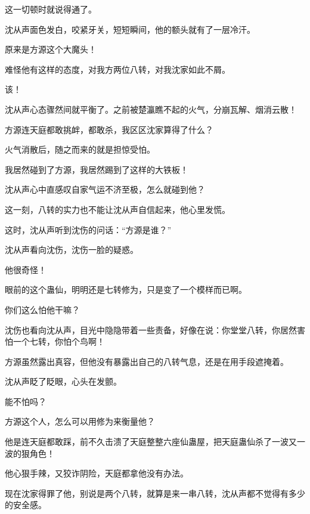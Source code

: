 \begin{this_body}
这一切顿时就说得通了。

沈从声面色发白，咬紧牙关，短短瞬间，他的额头就有了一层冷汗。

原来是方源这个大魔头！

难怪他有这样的态度，对我方两位八转，对我沈家如此不屑。

该！

沈从声心态骤然间就平衡了。之前被楚瀛瞧不起的火气，分崩瓦解、烟消云散！

方源连天庭都敢挑衅，都敢杀，我区区沈家算得了什么？

火气消散后，随之而来的就是担惊受怕。

我居然碰到了方源，我居然踢到了这样的大铁板！

沈从声心中直感叹自家气运不济至极，怎么就碰到他？

这一刻，八转的实力也不能让沈从声自信起来，他心里发慌。

这时，沈从声听到沈伤的问话：“方源是谁？”

沈从声看向沈伤，沈伤一脸的疑惑。

他很奇怪！

眼前的这个蛊仙，明明还是七转修为，只是变了一个模样而已啊。

你们这么怕他干嘛？

沈伤也看向沈从声，目光中隐隐带着一些责备，好像在说：你堂堂八转，你居然害怕一个七转，你怕个鸟啊！

方源虽然露出真容，但他没有暴露出自己的八转气息，还是在用手段遮掩着。

沈从声眨了眨眼，心头在发颤。

能不怕吗？

方源这个人，怎么可以用修为来衡量他？

他是连天庭都敢踩，前不久击溃了天庭整整六座仙蛊屋，把天庭蛊仙杀了一波又一波的狠角色！

他心狠手辣，又狡诈阴险，天庭都拿他没有办法。

现在沈家得罪了他，别说是两个八转，就算是来一串八转，沈从声都不觉得有多少的安全感。

\end{this_body}

